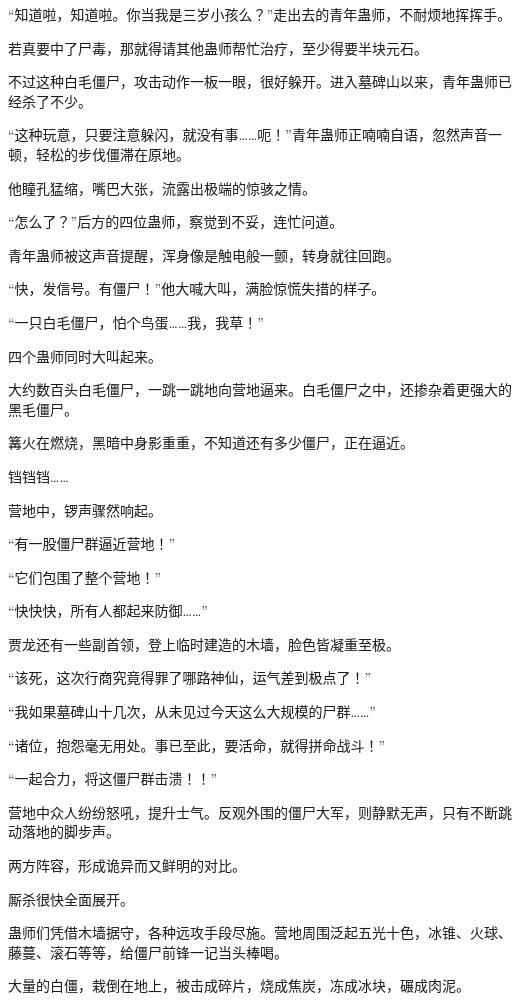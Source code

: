 \begin{this_body}
“知道啦，知道啦。你当我是三岁小孩么？”走出去的青年蛊师，不耐烦地挥挥手。

若真要中了尸毒，那就得请其他蛊师帮忙治疗，至少得要半块元石。

不过这种白毛僵尸，攻击动作一板一眼，很好躲开。进入墓碑山以来，青年蛊师已经杀了不少。

“这种玩意，只要注意躲闪，就没有事……呃！”青年蛊师正喃喃自语，忽然声音一顿，轻松的步伐僵滞在原地。

他瞳孔猛缩，嘴巴大张，流露出极端的惊骇之情。

“怎么了？”后方的四位蛊师，察觉到不妥，连忙问道。

青年蛊师被这声音提醒，浑身像是触电般一颤，转身就往回跑。

“快，发信号。有僵尸！”他大喊大叫，满脸惊慌失措的样子。

“一只白毛僵尸，怕个鸟蛋……我，我草！”

四个蛊师同时大叫起来。

大约数百头白毛僵尸，一跳一跳地向营地逼来。白毛僵尸之中，还掺杂着更强大的黑毛僵尸。

篝火在燃烧，黑暗中身影重重，不知道还有多少僵尸，正在逼近。

铛铛铛……

营地中，锣声骤然响起。

“有一股僵尸群逼近营地！”

“它们包围了整个营地！”

“快快快，所有人都起来防御……”

贾龙还有一些副首领，登上临时建造的木墙，脸色皆凝重至极。

“该死，这次行商究竟得罪了哪路神仙，运气差到极点了！”

“我如果墓碑山十几次，从未见过今天这么大规模的尸群……”

“诸位，抱怨毫无用处。事已至此，要活命，就得拼命战斗！”

“一起合力，将这僵尸群击溃！！”

营地中众人纷纷怒吼，提升士气。反观外围的僵尸大军，则静默无声，只有不断跳动落地的脚步声。

两方阵容，形成诡异而又鲜明的对比。

厮杀很快全面展开。

蛊师们凭借木墙据守，各种远攻手段尽施。营地周围泛起五光十色，冰锥、火球、藤蔓、滚石等等，给僵尸前锋一记当头棒喝。

大量的白僵，栽倒在地上，被击成碎片，烧成焦炭，冻成冰块，碾成肉泥。


\end{this_body}
